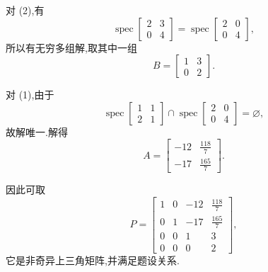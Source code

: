 \begin{problem}
\begin{solution}
对 (2),有
\[
\operatorname{spec}\!\begin{bmatrix}2&3\\0&4\end{bmatrix}
=\operatorname{spec}\!\begin{bmatrix}2&0\\0&4\end{bmatrix},
\]
所以有无穷多组解,取其中一组
\[
B=\begin{bmatrix}1&3\\0&2\end{bmatrix}.
\]

对 (1),由于
\[
\operatorname{spec}\!\begin{bmatrix}1&1\\2&1\end{bmatrix}
\cap
\operatorname{spec}\!\begin{bmatrix}2&0\\0&4\end{bmatrix}
=\varnothing,
\]
故解唯一.解得
\[
A=
\begin{bmatrix}
-12&\frac{118}{7}\\
-17&\frac{165}{7}
\end{bmatrix}.
\]

因此可取
\[
P=
\begin{bmatrix}
1&0&-12&\frac{118}{7}\\
0&1&-17&\frac{165}{7}\\
0&0&1&3\\
0&0&0&2
\end{bmatrix},
\]
它是非奇异上三角矩阵,并满足题设关系.
\end{solution}
\end{problem}

